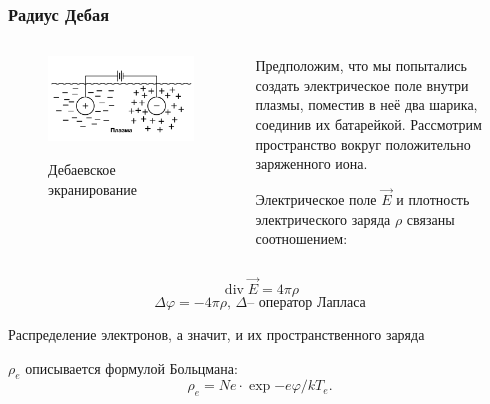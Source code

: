\documentclass[10pt,pdf,hyperref={unicode}, dvipsnames]{beamer}
\renewcommand{\phi}{\varphi}
\renewcommand{\div}{\operatorname{div}}
\begin{document}
\begin{frame}[t]\frametitle{Радиус Дебая}
\begin{minipage}[0.5\textheight]{\textwidth}

	\begin{columns}[T]

		\begin{column}{0.4\textwidth}
			\begin{figure}[tb]
				\vspace{0pt}
				\centering
				\includegraphics[width=\textwidth]{fig/debai}
				\label{fig:debai}
				\vspace{-20pt}

				\caption{Дебаевское экранирование}

			\end{figure}
		\end{column}


		\begin{column}{0.6\textwidth}
			Предположим, что мы попытались создать электрическое поле внутри плазмы, поместив в неё два шарика, соединив их батарейкой. Рассмотрим пространство вокруг положительно заряженного  иона.

			Электрическое поле $\vec{E}$ и плотность электрического заряда $\rho$ связаны соотношением:

		\end{column}
	\end{columns}
\end{minipage}

\begin{equation}
	\div{\vec{E}}=4\pi \rho
\end{equation}
\begin{equation}
	\Delta\phi= -4\pi\rho,\, \Delta \text{-- оператор Лапласа}
\end{equation}


Распределение электронов,
а значит, и их пространственного заряда

$\rho_e$ описывается формулой Больцмана:
\begin{equation}
	\rho_e= Ne\cdot \exp{-e\phi/kT_e}.
\end{equation}



\end{frame}
\end{document}

